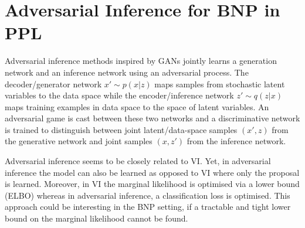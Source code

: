 \section{Adversarial Inference for \gls{BNP} in \gls{PPL}}
Adversarial inference methods \cite{Dumoulin:2016td, Donahue:2016wo, DBLP:conf/icml/MeschederNG17} inspired by GANs \cite{Goodfellow:2014wp} jointly learns a generation network and an inference network using an adversarial process.
The decoder/generator network $x' \sim p(x|z)$ maps samples from stochastic latent variables to the data space while the encoder/inference network $z' \sim q(z|x)$ maps training examples in data space to the space of latent variables.
An adversarial game is cast between these two networks and a discriminative network is trained to distinguish between joint latent/data-space samples $(x', z)$ from the generative network and joint samples $(x, z')$ from the inference network.

Adversarial inference seems to be closely related to \gls{VI}. Yet, in adversarial inference the model can also be learned as opposed to \gls{VI} where only the proposal is learned. Moreover, in \gls{VI} the marginal likelihood is optimised via a lower bound (ELBO) whereas in adversarial inference, a classification loss is optimised.
This approach could be interesting in the \gls{BNP} setting, if a tractable and tight lower bound on the marginal likelihood cannot be found.

